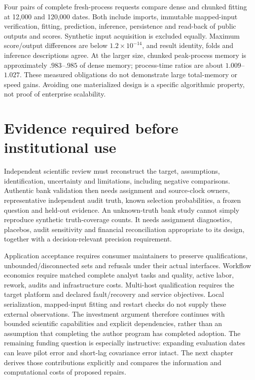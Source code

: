 Four pairs of complete fresh-process requests compare dense and chunked fitting
at 12,000 and 120,000 dates. Both include imports, immutable mapped-input
verification, fitting, prediction, inference, persistence and read-back of
public outputs and scores. Synthetic input acquisition is excluded equally.
Maximum score/output differences are below $1.2\times10^{-14}$, and result
identity, folds and inference descriptions agree. At the larger size, chunked
peak-process memory is approximately $.983$--$.985$ of dense memory; process-time
ratios are about $1.009$--$1.027$. These measured obligations do not demonstrate
large total-memory or speed gains. Avoiding one materialized design is a
specific algorithmic property, not proof of enterprise scalability.

\section{Evidence required before institutional use}
\label{r8:external}

Independent scientific review must reconstruct the target, assumptions,
identification, uncertainty and limitations, including negative comparisons.
Authentic bank validation then needs assignment and source-clock owners,
representative independent audit truth, known selection probabilities, a frozen
question and held-out evidence. An unknown-truth bank study cannot simply
reproduce synthetic truth-coverage counts. It needs assignment diagnostics,
placebos, audit sensitivity and financial reconciliation appropriate to its
design, together with a decision-relevant precision requirement.

Application acceptance requires consumer maintainers to preserve qualifications,
unbounded/disconnected sets and refusals under their actual interfaces. Workflow
economics require matched complete analyst tasks and quality, active labor,
rework, audits and infrastructure costs. Multi-host qualification requires the
target platform and declared fault/recovery and service objectives. Local
serialization, mapped-input fitting and restart checks do not supply these
external observations. The investment argument therefore continues with
bounded scientific capabilities and explicit dependencies, rather than an
assumption that completing the author program has completed adoption. The remaining funding question is especially instructive: expanding evaluation dates can leave pilot error and short-lag covariance error intact. The next chapter derives those contributions explicitly and compares the information and computational costs of proposed repairs.

